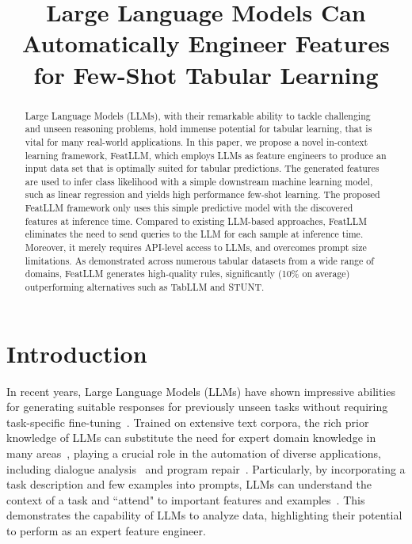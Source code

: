 \title{Large Language Models Can Automatically Engineer Features for Few-Shot Tabular Learning}

\begin{abstract}
Large Language Models (LLMs), with their remarkable ability to tackle challenging and unseen reasoning problems, hold immense potential for tabular learning, that is vital for many real-world applications. In this paper, we propose a novel in-context learning framework, \textsf{FeatLLM}, which employs LLMs as feature engineers to produce an input data set that is optimally suited for tabular predictions. The generated features are used to infer class likelihood with a simple downstream machine learning model, such as linear regression and yields high performance few-shot learning. The proposed \textsf{FeatLLM} framework only uses this simple predictive model with the discovered features at inference time. Compared to existing LLM-based approaches, \textsf{FeatLLM} eliminates the need to send queries to the LLM for each sample at inference time. Moreover, it merely requires API-level access to LLMs, and overcomes prompt size limitations. As demonstrated across numerous tabular datasets from a wide range of domains, \textsf{FeatLLM} generates high-quality rules, significantly (10\% on average) outperforming alternatives such as TabLLM and STUNT.
\end{abstract}

\section{Introduction}
In recent years, Large Language Models (LLMs) have shown impressive abilities for generating suitable responses for previously unseen tasks without requiring task-specific fine-tuning~\cite{creswell2022selection,imani2023mathprompter,taylor2022galactica}. Trained on extensive text corpora, the rich prior knowledge of LLMs can substitute the need for expert domain knowledge in many areas~\cite{Genomes2021,singhal2023large,wilcox2003role}, playing a crucial role in the automation of diverse applications, including dialogue analysis~\cite{finch2023leveraging} and program repair~\cite{fan2023automated}. Particularly, by incorporating a task description and few examples into prompts, LLMs can understand the context of a task and ``attend" to important features and examples~\cite{brown2020language,zhao2023survey}. This demonstrates the capability of LLMs to analyze data, highlighting their potential to perform as an expert feature engineer. 

